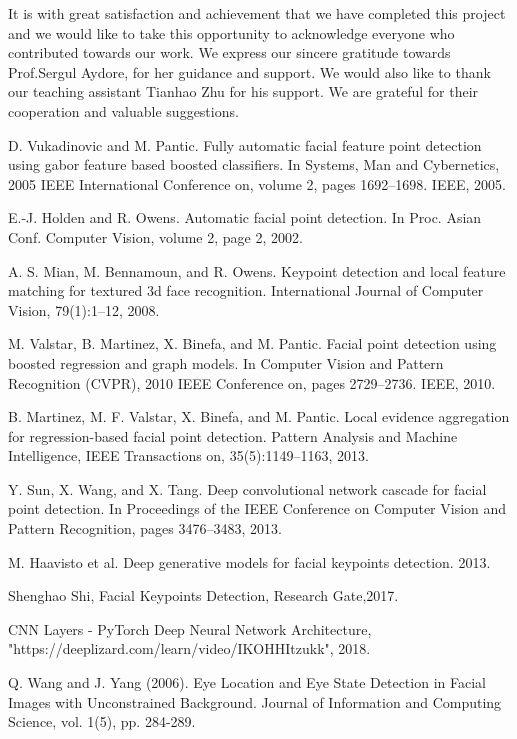 \documentclass[conference]{IEEEtran}
\begin{document}
It is with great satisfaction and achievement that we have completed this project and we would like to take this opportunity to acknowledge everyone who contributed towards our work. We express our sincere gratitude towards Prof.Sergul Aydore, for her guidance and support. We would also like to thank our teaching assistant Tianhao Zhu for his support. We are grateful for their cooperation and valuable suggestions.

\begin{thebibliography}{99}
    D. Vukadinovic and M. Pantic. Fully automatic facial feature point detection using gabor feature based
    boosted classifiers. In Systems, Man and Cybernetics,
    2005 IEEE International Conference on, volume 2,
    pages 1692–1698. IEEE, 2005.
    
    E.-J. Holden and R. Owens. Automatic facial point
    detection. In Proc. Asian Conf. Computer Vision, volume 2, page 2, 2002.
    
    A. S. Mian, M. Bennamoun, and R. Owens. Keypoint
    detection and local feature matching for textured 3d
    face recognition. International Journal of Computer
    Vision, 79(1):1–12, 2008.
    
    M. Valstar, B. Martinez, X. Binefa, and M. Pantic. Facial point detection using boosted regression
    and graph models. In Computer Vision and Pattern Recognition (CVPR), 2010 IEEE Conference on,
    pages 2729–2736. IEEE, 2010.
    
    B. Martinez, M. F. Valstar, X. Binefa, and M. Pantic. Local evidence aggregation for regression-based
    facial point detection. Pattern Analysis and Machine
    Intelligence, IEEE Transactions on, 35(5):1149–1163,
    2013.
    
    Y. Sun, X. Wang, and X. Tang. Deep convolutional
    network cascade for facial point detection. In Proceedings of the IEEE Conference on Computer Vision
    and Pattern Recognition, pages 3476–3483, 2013.
    
    M. Haavisto et al. Deep generative models for facial keypoints detection. 2013.
    
    Shenghao Shi, Facial Keypoints Detection, Research Gate,2017.
    
    CNN Layers - PyTorch Deep Neural Network Architecture,
    "https://deeplizard.com/learn/video/IKOHHItzukk", 2018.
    
     Q. Wang and J. Yang (2006). Eye Location and Eye State Detection in
    Facial Images with Unconstrained Background. Journal of Information and Computing Science, vol. 1(5), pp. 284-289.
    

\end{thebibliography}
\end{document}
